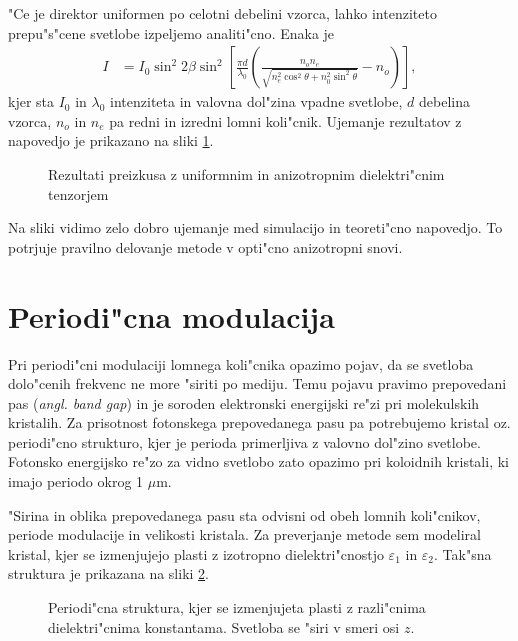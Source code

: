 \documentclass[12pt,twoside,openright,final]{report}
\newcommand{\angl}[1]{(\textit{angl. #1})}
\begin{document}
"Ce je direktor uniformen po celotni debelini vzorca, lahko intenziteto prepu"s"cene svetlobe izpeljemo analiti"cno\cite{kleman}. Enaka je
\begin{align}
 I &= I_0 \sin^2 2\beta \sin^2 \left[ \frac{\pi d}{\lambda_0} \left( \frac{n_o n_e}{\sqrt{n_e^2 \cos^2 \theta + n_0^2 \sin^2 \theta}} - n_o \right)\right],
\end{align}
kjer sta $I_0$ in $\lambda_0$ intenziteta in valovna dol"zina vpadne svetlobe, $d$ debelina vzorca, $n_o$ in $n_e$ pa redni in izredni lomni koli"cnik. 
Ujemanje rezultatov z napovedjo je prikazano na sliki \ref{fig:test-uniform}.

\begin{figure}[h]
 
 \caption{Rezultati preizkusa z uniformnim in anizotropnim dielektri"cnim tenzorjem}
 \label{fig:test-uniform}
\end{figure}

Na sliki vidimo zelo dobro ujemanje med simulacijo in teoreti"cno napovedjo. 
To potrjuje pravilno delovanje metode v opti"cno anizotropni snovi. 

\section{Periodi"cna modulacija}

Pri periodi"cni modulaciji lomnega koli"cnika opazimo pojav, da se svetloba dolo"cenih frekvenc ne more "siriti po mediju\cite{hecht-nano,joannopoulos}. 
Temu pojavu pravimo prepovedani pas \angl{band gap} in je soroden elektronski energijski re"zi pri molekulskih kristalih. 
Za prisotnost fotonskega prepovedanega pasu pa potrebujemo kristal oz. periodi"cno strukturo, kjer je perioda primerljiva z valovno dol"zino svetlobe. 
Fotonsko energijsko re"zo za vidno svetlobo zato opazimo pri koloidnih kristali, ki imajo periodo okrog 1 $\mu$m. 

"Sirina in oblika prepovedanega pasu sta odvisni od obeh lomnih koli"cnikov, periode modulacije in velikosti kristala. 
Za preverjanje metode sem modeliral kristal, kjer se izmenjujejo plasti z izotropno dielektri"cnostjo $\varepsilon_1$ in $\varepsilon_2$. 
Tak"sna struktura je prikazana na sliki \ref{fig:periodic-structure}. 

\begin{figure}[h]
 \centering
 
 \caption{Periodi"cna struktura, kjer se izmenjujeta plasti z razli"cnima dielektri"cnima konstantama. 
 Svetloba se "siri v smeri osi $z$\cite{joannopoulos}. }
 \label{fig:periodic-structure}
\end{figure}
\end{document}
